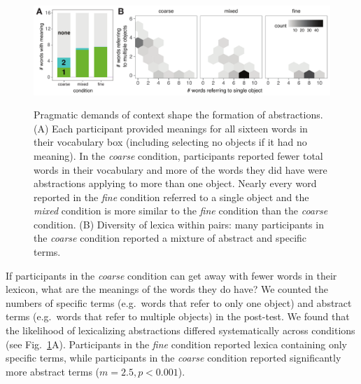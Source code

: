 \documentclass[10pt,letterpaper]{article}
\begin{document}
\begin{figure}[t]
\begin{center}
{\includegraphics[scale=0.75]{resultsFig_v1.pdf}}
{\caption{\footnotesize{Pragmatic demands of context shape the formation of abstractions. (A) Each participant provided meanings for all sixteen words in their vocabulary box (including selecting no objects if it had no meaning). In the \emph{coarse} condition, participants reported fewer total words in their vocabulary and more of the words they did have were abstractions applying to more than one object. %
Nearly every word reported in the \emph{fine} condition referred to a single object and the \emph{mixed} condition is more similar to the \emph{fine} condition than the \emph{coarse} condition. (B) Diversity of lexica within pairs: many participants in the \emph{coarse} condition reported a mixture of abstract and specific terms.%
\label{fig:lexiconContent}}}}
\end{center}
\end{figure}

If participants in the \emph{coarse} condition can get away with fewer words in their lexicon, what are the meanings of the words they do have? We counted the numbers of specific terms (e.g.\ words that refer to only one object) and abstract terms (e.g.\ words that refer to multiple objects) in the post-test. We found that the likelihood of lexicalizing abstractions differed systematically across conditions (see Fig.\ \ref{fig:lexiconContent}A). Participants in the \emph{fine} condition reported lexica containing only specific terms, while participants in the \emph{coarse} condition reported significantly more abstract terms ($m = 2.5, p < 0.001$). 
\end{document}
